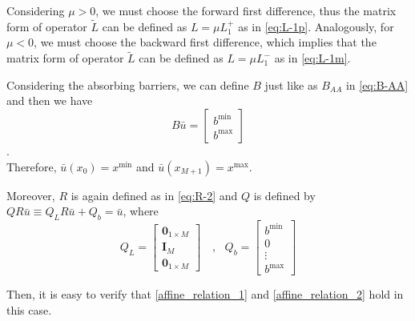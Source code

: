 \documentclass[11pt]{article}
\begin{document}
Considering $\mu>0$, we must choose the forward first difference, thus the matrix form of operator $\tilde{L}$ can be defined as $L = \mu L_1^+$ as in \cref{eq:L-1p}. Analogously, for $\mu<0$, we must choose the backward first difference, which implies that the matrix form of operator $\tilde{L}$ can be defined as $L = \mu L_1^-$ as in \cref{eq:L-1m}.

Considering the absorbing barriers, we can define $B$ just like as $B_{AA}$ in \cref{eq:B-AA} and then we have
\begin{equation}
B\bar{u} = \begin{bmatrix}
b^{\min}\\
b^{\max}
\end{bmatrix}
\end{equation}.\\
Therefore, $\bar{u}(x_0) = x^{\min}$ and $\bar{u}(x_{M+1}) = x^{\max}$.

Moreover, $R$ is again defined as in \cref{eq:R-2} and $Q$ is defined by $Q R\bar{u}\equiv Q_L R\bar{u}+Q_b = \bar{u}$, where
\begin{equation}
Q_L = \begin{bmatrix}
\mathbf{0}_{1\times M} \\
\mathbf{I}_M  \\
\mathbf{0}_{1\times M}
\end{bmatrix}%
\quad, \text{ } Q_b = \begin{bmatrix}
b^{\min}\\
0\\
\vdots\\
b^{\max}
\end{bmatrix}%
\end{equation}

Then, it is easy to verify that \cref{affine_relation_1} and \cref{affine_relation_2} hold in this case.


\end{document}
